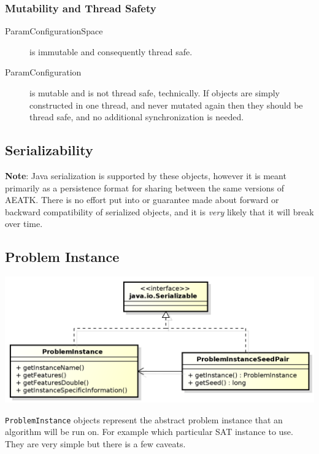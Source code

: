 \documentclass[11pt,letterpaper,oneside]{article}
\begin{document}
\subsubsection{Mutability and Thread Safety}

\begin{description}
\item[ParamConfigurationSpace] is immutable and consequently thread safe.
\item[ParamConfiguration] is mutable and is not thread safe, technically. If objects are simply constructed in one thread, and never mutated again then they should be thread safe, and no additional synchronization is needed.
\end{description}

\subsection{Serializability}

\textbf{Note}: Java serialization is supported by these objects, however it is meant primarily as a persistence format for sharing between the same versions of AEATK. There is no effort put into or guarantee made about forward or backward compatibility of serialized objects, and it is \emph{very} likely that it will break over time.

\subsection{Problem Instance}


\begin{center}
\includegraphics[scale=0.75]{img/UML/pi.png}
\end{center}

\texttt{ProblemInstance} objects represent the abstract problem instance that an algorithm will be run on. For example which particular SAT instance to use. They are very simple but there is a few caveats.
\end{document}
